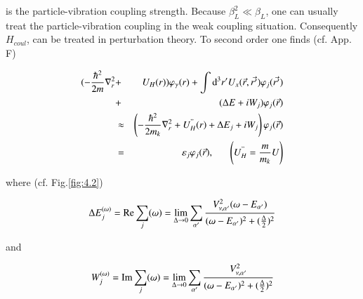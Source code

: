 \documentclass[a4paper,14pt]{book}
\begin{document}
\noindent is the particle-vibration coupling strength. Because $\beta_L^2 \ll \beta_L$, one can usually treat the particle-vibration coupling in the weak coupling situation. Consequently $H_{coul}$, can be treated in perturbation theory. To second order one finds (cf. App. F)

\begin{eqnarray}
\nonumber
( -\frac{\hbar^2}{2m} \nabla_r^2 &+& U_H(r)) \varphi_{\gamma}(r) + \int {\rm d}^3 r' U_x(\vec{r},\vec{r'})\varphi_j(\vec{r'}) \\
\nonumber
&+& (\Delta E +iW_j)\varphi_j(\vec{r}) \\
&\approx& \left( -\frac{\hbar^2}{2m_k} \nabla_r^2 + U_H^"(r) + \Delta E_j + iW_j \right) \varphi_j(\vec{r}) \\
\nonumber
&=& \varepsilon_j\varphi_j(\vec{r}), \;\;\;\;\;\; \left( U_H^" = \frac{m}{m_k} U \right) \\
\label{eqn:36}
\end{eqnarray}

\noindent where (cf. Fig.\ref{fig:4.2})

\begin{equation}
\Delta E_j^{(\omega)} = {\rm Re} \sum_j(\omega) = \lim_{\Delta \rightarrow 0} \sum_{\alpha'} \frac{V_{\nu ,\alpha'}^2 (\omega-E_{\alpha'})}{(\omega -E_{\alpha'})^2 + (\frac{\Delta}{2})^2}
\label{eqn:37a}
\end{equation}

\noindent and

\begin{equation}
W_j^{(\omega)} = {\rm Im} \sum_j(\omega) = \lim_{\Delta \rightarrow 0} \sum_{\alpha'} \frac{V_{\nu ,\alpha'}^2}{(\omega -E_{\alpha'})^2 + (\frac{\Delta}{2})^2}
\label{eqn:37b}
\end{equation}
\end{document}
